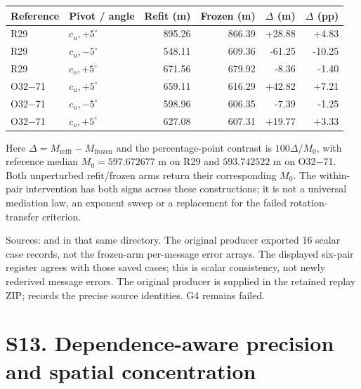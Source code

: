 \documentclass[journal,onecolumn,10pt]{IEEEtran}
\begin{document}
\begin{center}\begin{minipage}{\textwidth}\centering\small
{}\label{tab:s-rotation-refit-frozen}
\begin{tabular}{@{}llrrrr@{}}
\toprule
Reference & Pivot / angle & Refit (m) & Frozen (m) & $\Delta$ (m) & $\Delta$ (pp) \\
\midrule
R29 & $c_u,+5^\circ$ & 895.26 & 866.39 & +28.88 & +4.83 \\
R29 & $c_u,-5^\circ$ & 548.11 & 609.36 & -61.25 & -10.25 \\
R29 & $c_o,+5^\circ$ & 671.56 & 679.92 & -8.36 & -1.40 \\
O32$-$71 & $c_u,+5^\circ$ & 659.11 & 616.29 & +42.82 & +7.21 \\
O32$-$71 & $c_u,-5^\circ$ & 598.96 & 606.35 & -7.39 & -1.25 \\
O32$-$71 & $c_o,+5^\circ$ & 627.08 & 607.31 & +19.77 & +3.33 \\

\bottomrule
\end{tabular}
\end{minipage}\end{center}
Here $\Delta=M_{\mathrm{refit}}-M_{\mathrm{frozen}}$ and the percentage-point contrast is $100\Delta/M_0$, with reference median $M_0=597.672677$ m on R29 and $593.742522$ m on O32$-$71. Both unperturbed refit/frozen arms return their corresponding $M_0$. The within-pair intervention has both signs across these constructions; it is not a universal mediation law, an exponent sweep or a replacement for the failed rotation-transfer criterion.

Sources:  and  in that same directory. The original producer exported 16 scalar case records, not the frozen-arm per-message error arrays. The displayed six-pair register agrees with those saved cases; this is scalar consistency, not newly rederived message errors. The original producer is supplied in the retained replay ZIP;  records the precise source identities. G4 remains failed.

\section*{S13. Dependence-aware precision and spatial concentration}\label{s13.-dependence-aware-precision-and-spatial-concentration}
\end{document}
